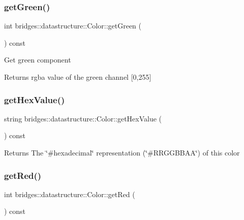 \subsubsection{\texorpdfstring{getGreen()}{getGreen()}}
{\footnotesize\ttfamily int bridges\+::datastructure\+::\+Color\+::get\+Green (\begin{DoxyParamCaption}{ }\end{DoxyParamCaption}) const\hspace{0.3cm}{\ttfamily [inline]}}

Get green component \begin{DoxyReturn}{Returns}
rgba value of the green channel \mbox{[}0,255\mbox{]} 
\end{DoxyReturn}
\mbox{\label{classbridges_1_1datastructure_1_1_color_a494648d2940754828f2054f92de031dc}} 
\subsubsection{\texorpdfstring{getHexValue()}{getHexValue()}}
{\footnotesize\ttfamily string bridges\+::datastructure\+::\+Color\+::get\+Hex\+Value (\begin{DoxyParamCaption}{ }\end{DoxyParamCaption}) const\hspace{0.3cm}{\ttfamily [inline]}}

\begin{DoxyReturn}{Returns}
The \char`\"{}\#hexadecimal\char`\"{} representation (\char`\"{}\#\+R\+R\+G\+G\+B\+B\+A\+A\char`\"{}) of this color 
\end{DoxyReturn}
\mbox{\label{classbridges_1_1datastructure_1_1_color_a7460203f01e0437e7ce23d85bffdb7ed}} 
\subsubsection{\texorpdfstring{getRed()}{getRed()}}
{\footnotesize\ttfamily int bridges\+::datastructure\+::\+Color\+::get\+Red (\begin{DoxyParamCaption}{ }\end{DoxyParamCaption}) const\hspace{0.3cm}{\ttfamily [inline]}}

